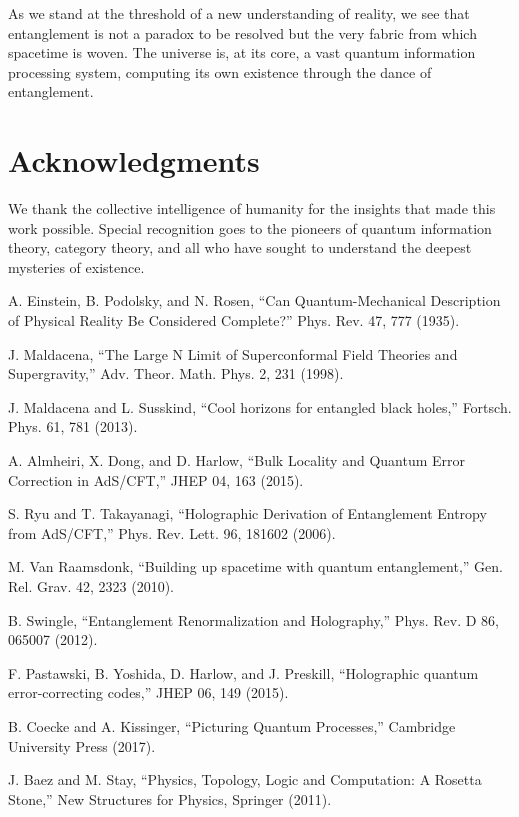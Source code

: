 \documentclass[12pt,a4paper]{article}
\theoremstyle{plain}
\theoremstyle{definition}
\theoremstyle{remark}
\begin{document}
As we stand at the threshold of a new understanding of reality, we see that entanglement is not a paradox to be resolved but the very fabric from which spacetime is woven. The universe is, at its core, a vast quantum information processing system, computing its own existence through the dance of entanglement.

\section*{Acknowledgments}

We thank the collective intelligence of humanity for the insights that made this work possible. Special recognition goes to the pioneers of quantum information theory, category theory, and all who have sought to understand the deepest mysteries of existence.

\begin{thebibliography}{99}

 A. Einstein, B. Podolsky, and N. Rosen, ``Can Quantum-Mechanical Description of Physical Reality Be Considered Complete?'' Phys. Rev. 47, 777 (1935).

 J. Maldacena, ``The Large N Limit of Superconformal Field Theories and Supergravity,'' Adv. Theor. Math. Phys. 2, 231 (1998).

 J. Maldacena and L. Susskind, ``Cool horizons for entangled black holes,'' Fortsch. Phys. 61, 781 (2013).

 A. Almheiri, X. Dong, and D. Harlow, ``Bulk Locality and Quantum Error Correction in AdS/CFT,'' JHEP 04, 163 (2015).

 S. Ryu and T. Takayanagi, ``Holographic Derivation of Entanglement Entropy from AdS/CFT,'' Phys. Rev. Lett. 96, 181602 (2006).

 M. Van Raamsdonk, ``Building up spacetime with quantum entanglement,'' Gen. Rel. Grav. 42, 2323 (2010).

 B. Swingle, ``Entanglement Renormalization and Holography,'' Phys. Rev. D 86, 065007 (2012).

 F. Pastawski, B. Yoshida, D. Harlow, and J. Preskill, ``Holographic quantum error-correcting codes,'' JHEP 06, 149 (2015).

 B. Coecke and A. Kissinger, ``Picturing Quantum Processes,'' Cambridge University Press (2017).

 J. Baez and M. Stay, ``Physics, Topology, Logic and Computation: A Rosetta Stone,'' New Structures for Physics, Springer (2011).

\end{thebibliography}
\end{document}
